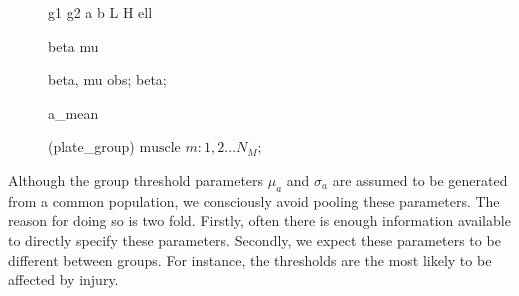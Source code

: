 \documentclass[a4paper,12pt]{article}
\begin{document}
\begin{figure}[H]
{        %
         {g1}
         {g2}
         {a}
         {b}
         {L}
         {H}
         {ell}

         {beta}
         {mu}

         {beta, mu}
         {obs};
         {beta};

         {a_mean}

         {(plate_group)} {$\text{muscle } m: 1, 2 \ldots N_M$};
    }
\end{figure}

Although the group threshold parameters $\mu_a$ and $\sigma_a$ are assumed to be generated from a common population, we consciously avoid pooling these parameters. The reason for doing so is two fold. Firstly, often there is enough information available to directly specify these parameters. Secondly, we expect these parameters to be different between groups. For instance, the thresholds are the most likely to be affected by injury.
\end{document}
